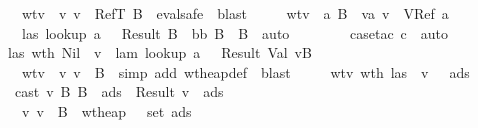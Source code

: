 \begin{isabellebody}
\ \ \ \ \ \ \ wtv{\isacharcolon}\ {\isachardoublequoteopen}{\isasymSigma}\ {\isasymturnstile}v\ v\ {\isacharcolon}\ RefT\ B{\isachardoublequoteclose}\ \isamarkupfalse \ eval{\isacharunderscore}safe\ \isamarkupfalse \ blast\isanewline
\ \ \ \ \isamarkupfalse \ wtv\ \isamarkupfalse \ a\ B{\isacharprime}\ \ va{\isacharcolon}\ {\isachardoublequoteopen}v\ {\isacharequal}\ VRef\ a{\isachardoublequoteclose}\isanewline
\ \ \ \ \ \ \ las{\isacharcolon}\ {\isachardoublequoteopen}lookup\ a\ {\isasymSigma}\ {\isacharequal}\ Result\ B{\isacharprime}{\isachardoublequoteclose}\ \ bb{\isacharcolon}\ {\isachardoublequoteopen}B{\isacharprime}\ {\isasymsqsubseteq}\ B{\isachardoublequoteclose}\ \isamarkupfalse \ auto\ \isanewline
\ \ \ \ \ \ \isamarkupfalse \ {\isacharparenleft}case{\isacharunderscore}tac\ c{\isacharparenright}\ \isamarkupfalse \ auto\ \isamarkupfalse \isanewline
\ \ \ \ \isamarkupfalse \ las\ wt{\isacharunderscore}h\ Nil\ \isamarkupfalse \ v{}\ \ lam{\isacharcolon}\ {\isachardoublequoteopen}lookup\ a\ {\isasymmu}\ {\isacharequal}\ Result\ {\isacharparenleft}Val\ v{}{\isacharcomma}B{\isacharprime}{\isacharparenright}{\isachardoublequoteclose}\isanewline
\ \ \ \ \ \ \ wtv{}{\isacharcolon}\ {\isachardoublequoteopen}{\isasymSigma}\ {\isasymturnstile}v\ v{}\ {\isacharcolon}\ B{\isacharprime}{\isachardoublequoteclose}\ \isamarkupfalse \ {\isacharparenleft}simp\ add{\isacharcolon}\ wt{\isacharunderscore}heap{\isacharunderscore}def{\isacharparenright}\ \isamarkupfalse \ blast\isanewline
\ \ \ \ \isamarkupfalse \ wtv{}\ wt{\isacharunderscore}h\ las\ \isamarkupfalse \ {\isachardoublequoteopen}{\isacharparenleft}{\isasymexists}v{\isacharprime}\ {\isasymSigma}{\isacharprime}\ {\isasymmu}{\isacharprime}\ ads{}{\isachardot}\isanewline
\ \ \ \ \ \ cast\ v{}\ B{\isacharprime}\ B\ {\isasymmu}\ ads\ {\isacharequal}\ Result\ {\isacharparenleft}v{\isacharprime}{\isacharcomma}\ {\isasymmu}{\isacharprime}{\isacharcomma}\ ads{}{\isacharparenright}\ {\isasymand}\isanewline
\ \ \ \ \ \ {\isasymSigma}{\isacharprime}\ {\isasymturnstile}v\ v{\isacharprime}\ {\isacharcolon}\ B\ {\isasymand}\ wt{\isacharunderscore}heap\ {\isasymSigma}{\isacharprime}\ {\isasymmu}{\isacharprime}\ {\isacharparenleft}set\ ads{}{\isacharparenright}\ {\isasymand}\ {\isasymSigma}{\isacharprime}\ {\isasymsqsubseteq}\ {\isasymSigma}{\isacharparenright}\ {\isasymor}\isanewline

\end{isabellebody}
